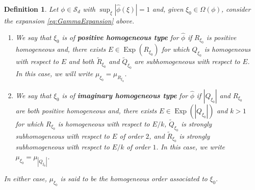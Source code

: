 \documentclass[11pt, letter]{book}
\newtheorem{definition}[theorem]{Definition}
\newcommand\Exp{\operatorname{Exp}}
\begin{document}
\begin{framed}
\begin{definition}\label{def:Types}
Let $\phi\in\mathcal{S}_d$ with $\sup_{\xi}|\widehat{\phi}(\xi)|=1$ and, given $\xi_0\in\Omega(\phi)$, consider the expansion \eqref{eq:GammaExpansion} above.
\begin{enumerate}
    \item We say that $\xi_0$ is of \textbf{positive homogeneous type} for $\widehat{\phi}$ if $R_{\xi_0}$ is positive homogeneous and, there exists $E\in \Exp(R_{\xi_0})$ for which $Q_{\xi_0}$ is homogeneous with respect to $E$ and both $\widetilde{R}_{\xi_0}$ and $\widetilde{Q}_{\xi_0}$ are subhomogeneous with respect to $E$. In this case, we will write  $\mu_{\xi_0}=\mu_{R_{\xi_0}}$.
\item We say that $\xi_0$ is of \textbf{imaginary homogeneous type} for $\widehat{\phi}$ if $|Q_{\xi_0}|$ and $R_{\xi_0}$ are both positive homogeneous and, there exists $E\in\Exp(|Q_{\xi_0}|)$ and $k>1$ for which $R_{\xi_0}$ is homogeneous with respect to $E/k$, $\widetilde{Q}_{\xi_0}$ is strongly subhomogeneous with respect to $E$ of order $2$, and $\widetilde{R}_{\xi_0}$ is strongly subhomogeneous with respect to $E/k$ of order $1$. In this case, we write $\mu_{\xi_0}=\mu_{|Q_{\xi_0}|}$.
\end{enumerate}
In either case, $\mu_{\xi_0}$ is said to be the homogeneous order associated to $\xi_0$.
\end{definition}
\end{framed}

\end{document}

